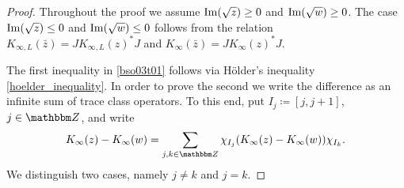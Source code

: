 \begin{proof}
Throughout the proof we assume $\operatorname{Im}(\sqrt{z})\geq 0$ and $\operatorname{Im}(\sqrt{w})\geq 0$. 
The case $\operatorname{Im}(\sqrt{z})\leq 0$ and $\operatorname{Im}(\sqrt{w})\leq 0$ follows from the relation $K_{\infty,L}(\bar{z}) = J K_{\infty,L}(z)^*J$ 
and $K_{\infty}(\bar{z}) = J K_{\infty}(z)^*J$.

The first inequality in \eqref{bso03t01} follows via H\"older's inequality \eqref{hoelder_inequality}.
In order to prove the second we write the difference as an infinite sum of trace class operators.
To this end, put $I_j\coloneqq[j,j+1]$, $j\in\Z$, and write
\begin{equation*}
  K_\infty(z) - K_\infty(w) = \sum_{j,k\in\Z} \chi_{I_j}(K_\infty(z) - K_\infty(w))\chi_{I_k} .
\end{equation*}
We distinguish two cases, namely $j\neq k$ and $j=k$.


\end{proof}
